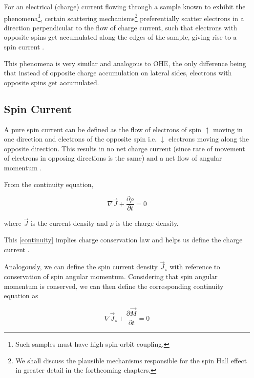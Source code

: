 For an electrical (charge) current flowing through a sample known to exhibit the phenomena\footnote{Such samples must have high spin-orbit coupling.}, certain scattering mechanisms\footnote{We shall discuss the plausible mechanisms responsible for the spin Hall effect in greater detail in the forthcoming chapters.} preferentially scatter electrons in a direction perpendicular to the flow of charge current, such that electrons with opposite spins get accumulated along the edges of the sample, giving rise to a spin current \cite{dyakonov1971current,hirsch1999spin}.

This phenomena is very similar and analogous to OHE, the only difference being that instead of opposite charge accumulation on lateral sides, electrons with opposite spins get accumulated.

\subsection{Spin Current}

\label{subsec:spin-current}

A pure spin current can be defined as the flow of electrons of spin $ \uparrow $ moving in one direction and electrons of the opposite spin i.e. $ \downarrow $ electrons moving along the opposite direction.
This results in no net charge current (since rate of movement of electrons in opposing directions is the same) and a net flow of angular momentum \cite{krishnan2016fundamentals}.

From the continuity equation,

\begin{equation} \label{continuity}
    \nabla \vec{J} + \frac{\partial \rho}{\partial t} = 0
\end{equation}

where $ \vec{J} $ is the current density and $ \rho $ is the charge density.

This \cref{continuity} implies charge conservation law and helps us define the charge current \cite{jackson1999classical}.

Analogously, we can define the spin current density $ \vec{J}_s $ with reference to conservation of spin angular momentum. Considering that spin angular momentum is conserved, we can then define the corresponding continuity equation as

\begin{equation} \label{spin-current-density}
    \nabla \vec{J}_s + \frac{\partial \vec{M}}{\partial t} = 0
\end{equation}

